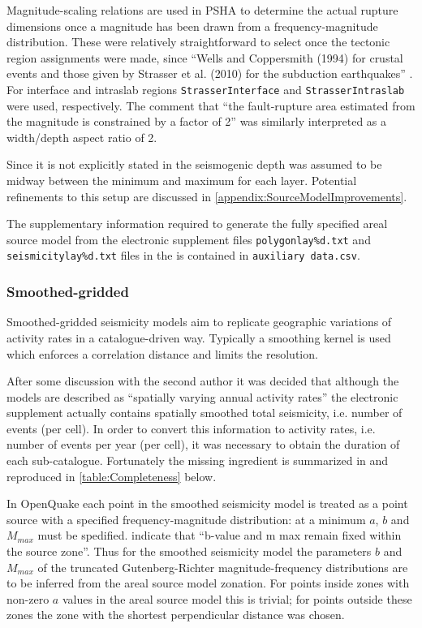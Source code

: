 \documentclass{article}
\begin{document}
Magnitude-scaling relations are used in PSHA to determine the actual rupture dimensions once a magnitude has been drawn from a frequency-magnitude distribution. These were relatively straightforward to select once the tectonic region assignments were made, since ``Wells and Coppersmith (1994) for crustal events and those given by
Strasser et al. (2010) for the subduction earthquakes'' \citep[p.~140]{nath2012probabilistic}. For interface and intraslab regions \texttt{StrasserInterface} and \texttt{StrasserIntraslab} were used, respectively. The comment that ``the fault-rupture area estimated from the magnitude is constrained by a factor of 2'' \citep[p.~140]{nath2012probabilistic} was similarly interpreted as a width/depth aspect ratio of 2.

Since it is not explicitly stated in \cite{nath2012probabilistic} the seismogenic depth was assumed to be midway between the minimum and maximum for each layer. Potential refinements to this setup are discussed in \autoref{appendix:SourceModelImprovements}.

The supplementary information required to generate the fully specified areal source model from the electronic supplement files \texttt{polygonlay\%d.txt} and \texttt{seismicitylay\%d.txt} files in the is contained in \texttt{auxiliary data.csv}.

\subsubsection{Smoothed-gridded}
\label{subsubsec:Smoothed}

Smoothed-gridded seismicity models aim to replicate geographic variations of activity rates in a catalogue-driven way. Typically a smoothing kernel is used which enforces a correlation distance and limits the resolution.

After some discussion with the second author it was decided that although the models are described as ``spatially varying annual activity rates'' \cite[p.~140]{nath2012probabilistic} the electronic supplement actually contains spatially smoothed total seismicity, i.e. number of events (per cell). In order to convert this information to activity rates, i.e. number of events per year (per cell), it was necessary to obtain the duration of each sub-catalogue. Fortunately the missing ingredient is summarized in \cite[Table 1]{thingbaijam2011seismogenic} and reproduced in \autoref{table:Completeness} below.

In OpenQuake each point in the smoothed seismicity model is treated as a point source with a specified frequency-magnitude distribution: at a minimum $a$, $b$ and $M_{max}$ must be spedified. \cite{nath2012probabilistic} indicate that ``b-value and m max remain fixed within the source zone''. Thus for the smoothed seismicity model the parameters $b$ and $M_{max}$ of the truncated Gutenberg-Richter magnitude-frequency distributions are to be inferred from the areal source model zonation. For points inside zones with non-zero $a$ values in the areal source model this is trivial; for points outside these zones the zone with the shortest perpendicular distance was chosen.
\end{document}
